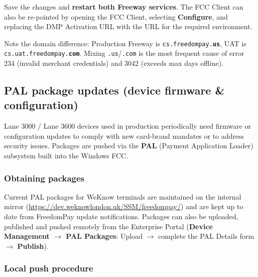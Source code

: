 \documentclass[a4paper,10pt]{article}
\begin{document}
Save the changes and \textbf{restart both Freeway services}. The FCC
Client can also be re-pointed by opening the FCC Client, selecting
\textbf{Configure}, and replacing the DMP Activation URL with the URL for
the required environment.

\begin{wkwarn}
Note the domain difference: Production Freeway is
\texttt{cs.freedompay.\textbf{us}}, UAT is
\texttt{cs.uat.freedompay.\textbf{com}}. Mixing \texttt{.us}/\texttt{.com}
is the most frequent cause of error 234 (invalid merchant credentials)
and 3042 (exceeds max days offline).
\end{wkwarn}

\subsection{PAL package updates (device firmware \& configuration)}

Lane 3000 / Lane 3600 devices used in production periodically need
firmware or configuration updates to comply with new card-brand mandates
or to address security issues. Packages are pushed via the \textbf{PAL}
(Payment Application Loader) subsystem built into the Windows FCC.

\subsubsection*{Obtaining packages}

Current PAL packages for WeKnow terminals are maintained on the internal
mirror (\url{https://dev.weknowlondon.uk/SSM/freedompay/}) and are
kept up to date from FreedomPay update notifications. Packages can also
be uploaded, published and pushed remotely from the Enterprise Portal
(\textbf{Device Management $\rightarrow$ PAL Packages}: Upload
$\rightarrow$ complete the PAL Details form $\rightarrow$
\textbf{Publish}).

\subsubsection*{Local push procedure}
\end{document}
